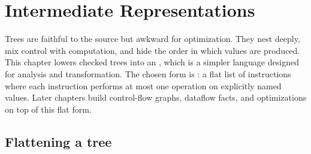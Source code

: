 \chapter{Intermediate Representations}
\label{ch:intermediate-representations}

Trees are faithful to the source but awkward for optimization.
They nest deeply, mix control with computation, and hide the order in which values are produced.
This chapter lowers checked trees into an , which is a simpler language designed for analysis and transformation.
The chosen form is : a flat list of instructions where each instruction performs at most one operation on explicitly named values.
Later chapters build control-flow graphs, dataflow facts, and optimizations on top of this flat form.

\section{Flattening a tree}
\label{sec:ch06-flattening-tree}

